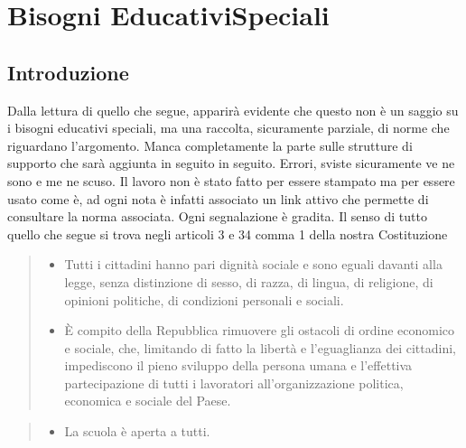 \chapter[BES]{Bisogni\xheadbreak{}
	Educativi\xheadbreak{}Speciali}
\label{BES}
\section{Introduzione}
\label{sec:introduzione}
Dalla lettura di quello che segue, apparirà evidente che questo non è un saggio su i bisogni educativi speciali, ma una raccolta, sicuramente parziale, di norme che riguardano l'argomento. Manca completamente la parte sulle strutture di supporto che sarà aggiunta in seguito in seguito. Errori, sviste sicuramente ve ne sono e me ne scuso. Il lavoro non è stato fatto per essere stampato ma per essere usato come è, ad ogni nota è infatti associato un link attivo che permette di consultare la norma associata. Ogni segnalazione è gradita.
Il senso di tutto quello che segue si trova negli articoli 3 e 34 comma 1 della nostra Costituzione
\begin{quote}
	\begin{itemize}
		\item Tutti i cittadini hanno pari dignità sociale e sono eguali davanti alla legge, senza distinzione di sesso, di razza, di lingua, di religione, di opinioni politiche, di condizioni personali e sociali.
		\item È compito della Repubblica rimuovere gli ostacoli di ordine economico e sociale, che, limitando di fatto la libertà e l'eguaglianza dei cittadini, impediscono il pieno sviluppo della persona umana e l'effettiva partecipazione di tutti i lavoratori all'organizzazione politica, economica e sociale del Paese.
	\end{itemize}
\end{quote}
\begin{quote}
	\begin{itemize}
		\item La scuola è aperta a tutti.
	\end{itemize}
\end{quote}
